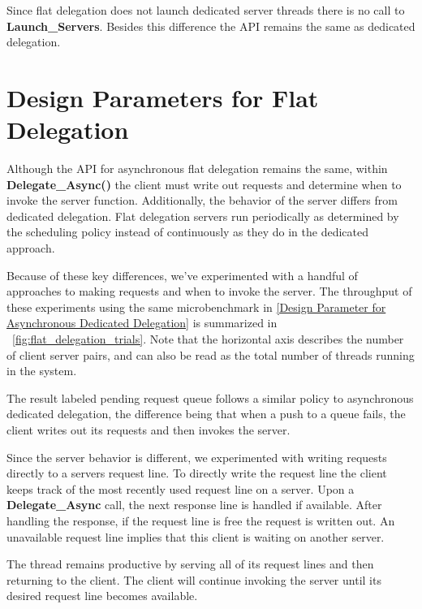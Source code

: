 \documentclass{uicthesi}
\begin{document}
Since flat delegation does not launch dedicated server threads there is no call to \textbf{Launch\_Servers}. Besides this difference the API remains the same as dedicated delegation. 

\section{Design Parameters for Flat Delegation}  


Although the API for asynchronous flat delegation remains the same, within \textbf{Delegate\_Async()} the client must write out requests and determine when to invoke the server function. Additionally, the behavior of the server differs from dedicated delegation. Flat delegation servers run periodically as determined by the scheduling policy instead of continuously as they do in the dedicated approach. 

Because of these key differences, we've experimented with a handful of approaches to making requests and when to invoke the server. The throughput of these experiments using the same microbenchmark in \ref{Design Parameter for Asynchronous Dedicated Delegation} is summarized in ~\ref{fig:flat_delegation_trials}. Note that the horizontal axis describes the number of client server pairs, and can also be read as the total number of threads running in the system. 

The result labeled pending request queue follows a similar policy to asynchronous dedicated delegation, the difference being that when a push to a queue fails, the client writes out its requests and then invokes the server. 

Since the server behavior is different, we experimented with writing requests directly to a servers request line. To directly write the request line the client keeps track of the most recently used request line on a server. Upon a \textbf{Delegate\_Async} call, the next response line is handled if available. After handling the response, if the request line is free the request is written out. An unavailable request line implies that this client is waiting on another server. 

The thread remains productive by serving all of its request lines and then returning to the client. The client will continue invoking the server until its desired request line becomes available. 
\end{document}
